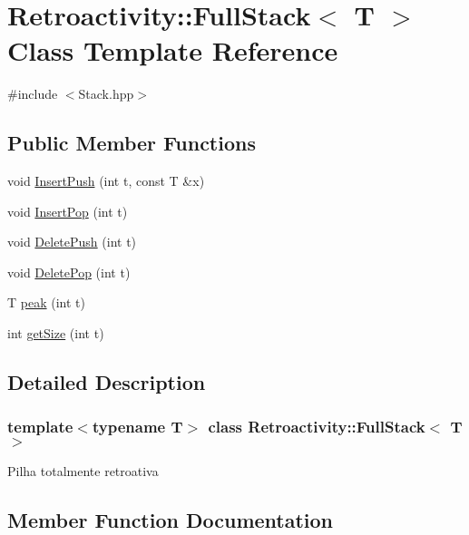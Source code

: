 \hypertarget{classRetroactivity_1_1FullStack}{}\section{Retroactivity\+:\+:Full\+Stack$<$ T $>$ Class Template Reference}
\label{classRetroactivity_1_1FullStack}


{\ttfamily \#include $<$Stack.\+hpp$>$}

\subsection*{Public Member Functions}
\begin{DoxyCompactItemize}
\item 
void \hyperlink{classRetroactivity_1_1FullStack_a21e431dc5beaaba13e7ad4052ea590b4}{Insert\+Push} (int t, const T \&x)
\item 
void \hyperlink{classRetroactivity_1_1FullStack_a9187befbb123f18cf843cfb78f8ba2ae}{Insert\+Pop} (int t)
\item 
void \hyperlink{classRetroactivity_1_1FullStack_ae3817cbeed3650f16f86fc1bccc73a0d}{Delete\+Push} (int t)
\item 
void \hyperlink{classRetroactivity_1_1FullStack_a4bc32042eb75846d744190540265f823}{Delete\+Pop} (int t)
\item 
T \hyperlink{classRetroactivity_1_1FullStack_abfbe785565c41e62688a5edeea1becc0}{peak} (int t)
\item 
int \hyperlink{classRetroactivity_1_1FullStack_aaaeedeaad4afd857bc2e28af1b2ad5c6}{get\+Size} (int t)
\end{DoxyCompactItemize}


\subsection{Detailed Description}
\subsubsection*{template$<$typename T$>$\newline
class Retroactivity\+::\+Full\+Stack$<$ T $>$}

Pilha totalmente retroativa 

\subsection{Member Function Documentation}
\mbox{\label{classRetroactivity_1_1FullStack_a4bc32042eb75846d744190540265f823}} 
